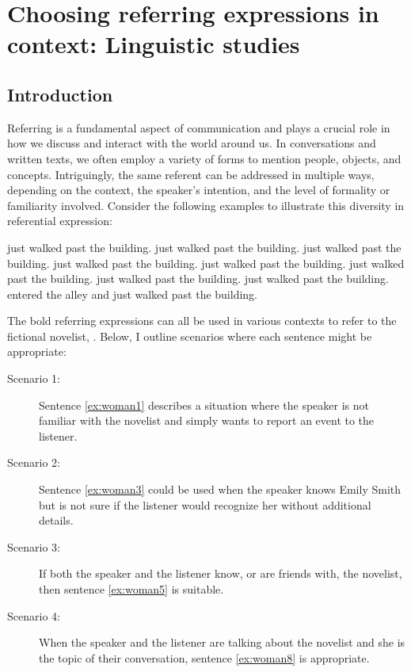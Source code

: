 \chapter{Choosing referring expressions in context: Linguistic studies}\label{chap2}


\section{Introduction}\label{chap2:sec:intro}

Referring is a fundamental aspect of communication and plays a crucial role in how we discuss and interact with the world around us. In conversations and written texts, we often employ a variety of forms to mention people, objects, and concepts. Intriguingly, the same referent can be addressed in multiple ways, depending on the context, the speaker's intention, and the level of formality or familiarity involved. Consider the following examples to illustrate this diversity in referential expression:

\begin{exe}
	\ex 
	\begin{xlist}
		\ex {} just walked past the building. \label{ex:woman1}
		\ex {} just walked past the building. \label{ex:woman2}
		\ex {} just walked past the building. \label{ex:woman3}
		\ex {} just walked past the building. \label{ex:woman4}
		\ex {} just walked past the building. \label{ex:woman5}
		\ex {} just walked past the building. \label{ex:woman6}
		\ex {} just walked past the building. \label{ex:woman7}
		\ex {} just walked past the building. \label{ex:woman8}
		\ex {} entered the alley and \italunder{$\emptyset$} just walked past the building. \label{ex:woman9}
	\end{xlist} 
\end{exe}

The bold referring expressions can all be used in various contexts to refer to the fictional novelist, . Below, I outline scenarios where each sentence might be appropriate:

\begin{description}
	\item[Scenario 1:]Sentence \ref{ex:woman1} describes a situation where the speaker is not familiar with the novelist and simply wants to report an event to the listener.
	\item[Scenario 2:]Sentence \ref{ex:woman3} could be used when the speaker knows Emily Smith but is not sure if the listener would recognize her without additional details.
	\item[Scenario 3:] If both the speaker and the listener know, or are friends with, the novelist, then sentence \ref{ex:woman5} is suitable.
	\item[Scenario 4:] When the speaker and the listener are talking about the novelist and she is the topic of their conversation, sentence \ref{ex:woman8} is appropriate.
\end{description}


